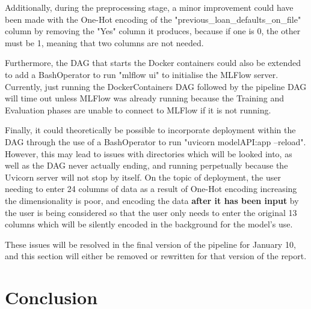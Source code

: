 \documentclass[12pt]{report}
\newcommand{\para}{\vspace{7pt}\noindent}
\begin{document}
\para Additionally, during the preprocessing stage, a minor improvement could have been made with the One-Hot 
encoding of the "previous\_loan\_defaults\_on\_file" column by removing the "Yes" column it produces, because 
if one is 0, the other must be 1, meaning that two columns are not needed.

\para Furthermore, the DAG that starts the Docker containers could also be extended to add a BashOperator to run 
"mlflow ui" to initialise the MLFlow server. Currently, just running the DockerContainers DAG followed by the pipeline DAG will 
time out unless MLFlow was already running because the Training and Evaluation phases are unable to connect to MLFlow 
if it is not running.

\para Finally, it could theoretically be possible to incorporate deployment within the DAG through the use of a 
BashOperator to run "uvicorn modelAPI:app --reload". However, this may lead to issues with directories which will be 
looked into, as well as the DAG never actually ending, and running perpetually because the Uvicorn server will not stop 
by itself. On the topic of deployment, the user needing to enter 24 columns of data as a result of One-Hot encoding 
increasing the dimensionality is poor, and encoding the data \textbf{after it has been input} by the user is being considered so 
that the user only needs to enter the original 13 columns which will be silently encoded in the background for the model's use.

\para These issues will be resolved in the final version of the pipeline for January 10, and this section will either 
be removed or rewritten for that version of the report.

\chapter*{Conclusion}

% 

\end{document}
